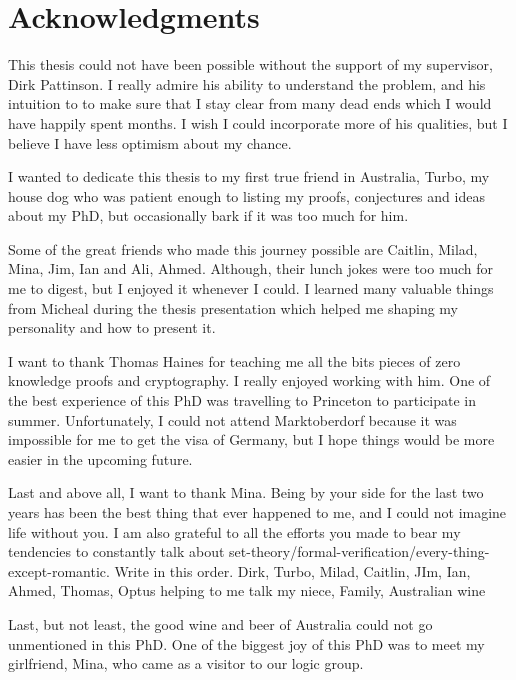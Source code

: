 \chapter*{Acknowledgments}
This thesis could not have been possible without the support of my supervisor, Dirk Pattinson. I really admire his 
ability to understand the problem, and his intuition to to make sure that I stay clear from many dead ends which 
I would have happily spent months. I wish
I could incorporate more of his qualities, but I believe I have less optimism about my chance.

 I wanted to dedicate this thesis to my first true friend in Australia, Turbo, my house dog who was patient enough to 
 listing my proofs, conjectures and ideas about my PhD, but occasionally  bark if it was too much for him. 
 
 Some of the great friends who made this journey possible are Caitlin, Milad, Mina, Jim, Ian and Ali, Ahmed. Although, 
 their lunch jokes were too much for me to digest, but I enjoyed it whenever I could.  I learned many valuable things 
 from Micheal during the thesis presentation which helped me shaping my personality and how to present it. 
 
 I want to thank Thomas Haines for teaching me all the bits pieces of zero knowledge proofs and cryptography. I really 
 enjoyed working with him. One of the best experience of this PhD was travelling to Princeton to participate in summer. 
 Unfortunately, I could not attend Marktoberdorf because it was impossible for me to get the visa of Germany, but I hope
 things would be more easier in the upcoming future. 
 
 Last and above all, I want to thank Mina. Being by your side for the last two years has been the best thing that ever happened to me, and I could not 
 imagine life without you.   I am also grateful to all the efforts you made to bear my tendencies to constantly
  talk about set-theory/formal-verification/every-thing-except-romantic.
 Write in this order. 
 Dirk, Turbo, Milad, Caitlin,  JIm, Ian, Ahmed, Thomas, Optus helping to me talk my niece, Family, Australian wine
 
 Last, but not least, the good wine and beer of Australia could not go unmentioned in this PhD. 
One of the biggest joy of this PhD was to meet my girlfriend, Mina, who came as a visitor to our logic group. 

